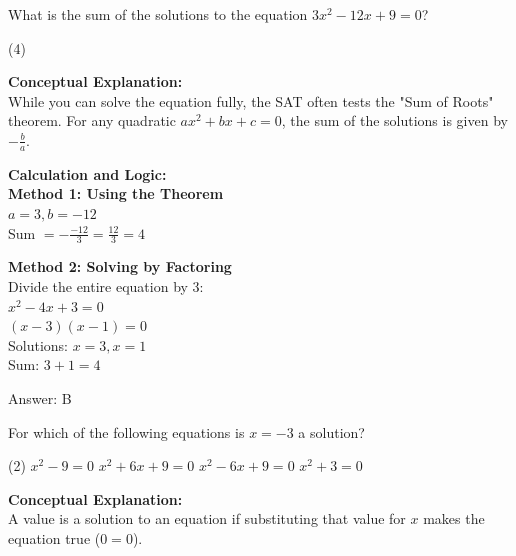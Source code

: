 \documentclass[11pt,paper=a4,answers]{exam}
\begin{document}
\begin{questions}
\vspace{30pt}

\question
What is the sum of the solutions to the equation $3x^2 - 12x + 9 = 0$?
\begin{tasks}(4)
\end{tasks}

\begin{solution}
\textbf{Conceptual Explanation:} \\
While you can solve the equation fully, the SAT often tests the "Sum of Roots" theorem. For any quadratic $ax^2 + bx + c = 0$, the sum of the solutions is given by $-\frac{b}{a}$.

\vspace{15pt}

\textbf{Calculation and Logic:} \\
\textbf{Method 1: Using the Theorem} \\
$a = 3, b = -12$ \\
Sum $= -\frac{-12}{3} = \frac{12}{3} = 4$

\vspace{10pt}

\textbf{Method 2: Solving by Factoring} \\
Divide the entire equation by 3: \\
$x^2 - 4x + 3 = 0$ \\
$(x - 3)(x - 1) = 0$ \\
Solutions: $x = 3, x = 1$ \\
Sum: $3 + 1 = 4$

\vspace{20pt}

Answer: \colorbox{yellow!100}{B}
\end{solution}

\vspace{30pt}

\question
For which of the following equations is $x = -3$ a solution?
\begin{tasks}(2)
    \task $x^2 - 9 = 0$
    \task $x^2 + 6x + 9 = 0$
    \task $x^2 - 6x + 9 = 0$
    \task $x^2 + 3 = 0$
\end{tasks}

\begin{solution}
\textbf{Conceptual Explanation:} \\
A value is a solution to an equation if substituting that value for $x$ makes the equation true ($0 = 0$).


\end{solution}
\end{questions}
\end{document}
